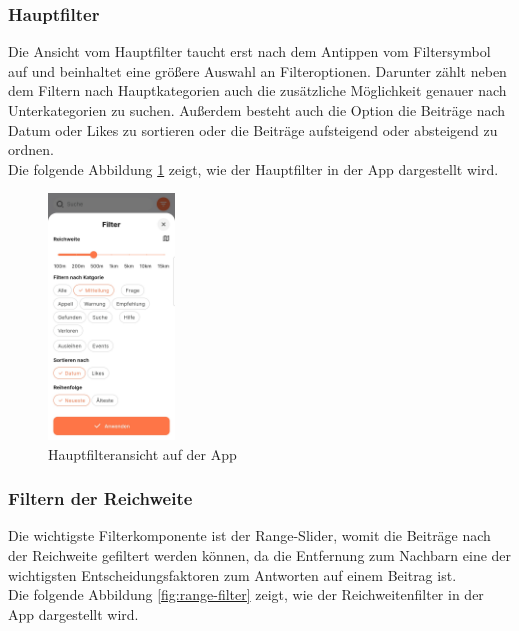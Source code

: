\subsubsection{Hauptfilter}

Die Ansicht vom Hauptfilter taucht erst nach dem Antippen vom Filtersymbol auf und beinhaltet eine größere Auswahl an Filteroptionen. Darunter zählt neben dem Filtern nach Hauptkategorien auch die zusätzliche Möglichkeit genauer nach Unterkategorien zu suchen. Außerdem besteht auch die Option die Beiträge nach Datum oder Likes zu sortieren oder die Beiträge aufsteigend oder absteigend zu ordnen.
\\
Die folgende Abbildung \ref{fig:main-filter} zeigt, wie der Hauptfilter in der App dargestellt wird.

\begin{figure}[h]
  \centering
  \includegraphics[width=0.3\textwidth]{pics/main-filter.jpg}
  \caption{Hauptfilteransicht auf der App}
  \label{fig:main-filter}
\end{figure}

\subsubsection{Filtern der Reichweite}

Die wichtigste Filterkomponente ist der Range-Slider, womit die Beiträge nach der Reichweite gefiltert werden können, da die Entfernung zum Nachbarn eine der wichtigsten Entscheidungsfaktoren zum Antworten auf einem Beitrag ist.
\\
Die folgende Abbildung \ref{fig:range-filter} zeigt, wie der Reichweitenfilter in der App dargestellt wird.

